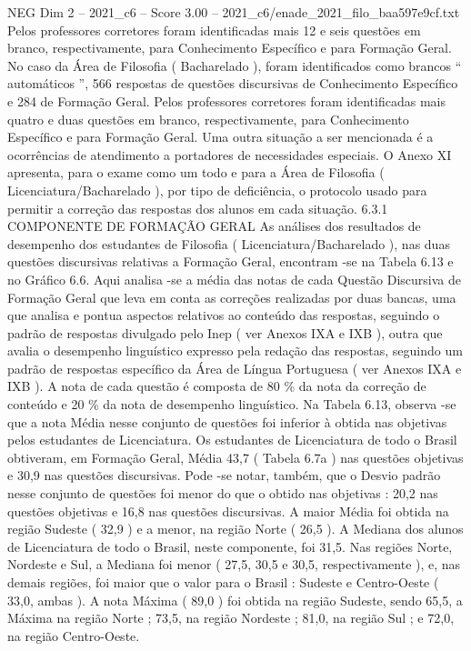 \begin{textsample}{NEG Dim 2 – 2021\_c6 – Score 3.00 – 2021\_c6/enade\_2021\_filo\_baa597e9cf.txt}
Pelos professores corretores foram identificadas mais 12 e seis questões em branco, respectivamente, para Conhecimento Específico e para Formação Geral.
No caso da Área de Filosofia ( Bacharelado ), foram identificados como brancos “ automáticos ”, 566 respostas de questões discursivas de Conhecimento Específico e 284 de Formação Geral.
Pelos professores corretores foram identificadas mais quatro e duas questões em branco, respectivamente, para Conhecimento Específico e para Formação Geral.
Uma outra situação a ser mencionada é a ocorrências de atendimento a portadores de necessidades especiais.
O Anexo XI apresenta, para o exame como um todo e para a Área de Filosofia ( Licenciatura/Bacharelado ), por tipo de deficiência, o protocolo usado para permitir a correção das respostas dos alunos em cada situação. 6.3.1 COMPONENTE DE FORMAÇÃO GERAL As análises dos resultados de desempenho dos estudantes de Filosofia ( Licenciatura/Bacharelado ), nas duas questões discursivas relativas a Formação Geral, encontram -se na Tabela 6.13 e no Gráfico 6.6.
Aqui analisa -se a média das notas de cada Questão Discursiva de Formação Geral que leva em conta as correções realizadas por duas bancas, uma que analisa e pontua aspectos relativos ao conteúdo das respostas, seguindo o padrão de respostas divulgado pelo Inep ( ver Anexos IXA e IXB ), outra que avalia o desempenho linguístico expresso pela redação das respostas, seguindo um padrão de respostas específico da Área de Língua Portuguesa ( ver Anexos IXA e IXB ).
A nota de cada questão é composta de 80 \% da nota da correção de conteúdo e 20 \% da nota de desempenho linguístico.
Na Tabela 6.13, observa -se que a nota Média nesse conjunto de questões foi inferior à obtida nas objetivas pelos estudantes de Licenciatura.
Os estudantes de Licenciatura de todo o Brasil obtiveram, em Formação Geral, Média 43,7 ( Tabela 6.7a ) nas questões objetivas e 30,9 nas questões discursivas.
Pode -se notar, também, que o Desvio padrão nesse conjunto de questões foi menor do que o obtido nas objetivas : 20,2 nas questões objetivas e 16,8 nas questões discursivas.
A maior Média foi obtida na região Sudeste ( 32,9 ) e a menor, na região Norte ( 26,5 ).
A Mediana dos alunos de Licenciatura de todo o Brasil, neste componente, foi 31,5.
Nas regiões Norte, Nordeste e Sul, a Mediana foi menor ( 27,5, 30,5 e 30,5, respectivamente ), e, nas demais regiões, foi maior que o valor para o Brasil : Sudeste e Centro-Oeste ( 33,0, ambas ).
A nota Máxima ( 89,0 ) foi obtida na região Sudeste, sendo 65,5, a Máxima na região Norte ; 73,5, na região Nordeste ; 81,0, na região Sul ; e 72,0, na região Centro-Oeste.

\end{textsample}
